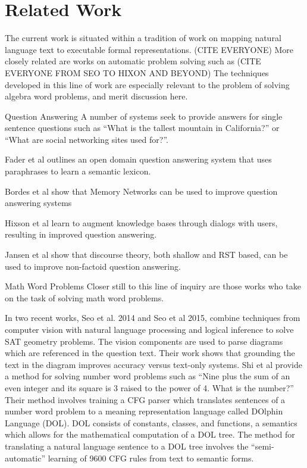 \section{Related Work}
The current work is situated within a tradition of work on mapping natural language text to executable formal representations. (CITE EVERYONE)
More closely related are works on automatic problem solving such as (CITE EVERYONE FROM SEO TO HIXON AND BEYOND)
The techniques developed in this line of work are especially relevant to the problem of solving algebra word problems, and merit discussion here.

Question Answering
A number of systems seek to provide answers for single sentence questions such as “What is the tallest mountain in California?” or “What are social networking sites used for?”. 

Fader et al outlines an open domain question answering system that uses paraphrases to learn a semantic lexicon.

Bordes et al show that Memory Networks can be used to improve question answering systems

Hixson et al learn to augment knowledge bases through dialogs with users, resulting in improved question answering.

Jansen et al show that discourse theory, both shallow and RST based, can be used to improve non-factoid question answering. 


Math Word Problems
Closer still to this line of inquiry are those works who take on the task of solving math word problems.
 
In two recent works, Seo et al. 2014 and Seo et al 2015, combine techniques from computer vision with natural language processing and logical inference to solve SAT geometry problems. The vision components are used to parse diagrams which are referenced in the question text. Their work shows that grounding the text in the diagram improves accuracy versus text-only systems.
Shi et al provide a method for solving number word problems such as “Nine plus the sum of an even integer and its square is 3 raised to the power of 4. What is the number?”  Their method involves training a CFG parser which translates sentences of a number word problem to a meaning representation language called DOlphin Language (DOL). DOL consists of constants, classes, and functions, a semantics which allows for the mathematical computation of a DOL tree. The method for translating a natural language sentence to a DOL tree involves the “semi-automatic” learning of 9600 CFG rules from text to semantic forms. 


